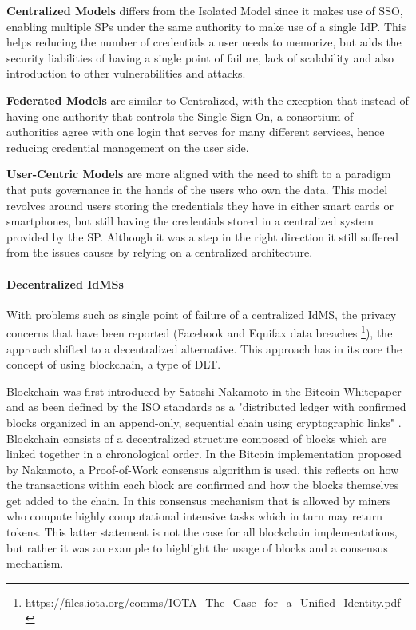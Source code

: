 \textbf{Centralized Models} differs from the Isolated Model since it makes use of \acrfull{SSO}, enabling multiple SPs under the same authority to make use of a single IdP. This helps reducing the number of credentials a user needs to memorize, but adds the security liabilities of having a single point of failure, lack of scalability and also introduction to other vulnerabilities and attacks.

\textbf{Federated Models} are similar to Centralized, with the exception that instead of having one authority that controls the Single Sign-On, a consortium of authorities agree with one login that serves for many different services, hence reducing credential management on the user side.

\textbf{User-Centric Models} are more aligned with the need to shift to a paradigm that puts governance in the hands of the users who own the data. This model revolves around users storing the credentials they have in either smart cards or smartphones, but still having the credentials stored in a centralized system provided by the SP. Although it was a step in the right direction it still suffered from the issues causes by relying on a centralized architecture.

\paragraph{Decentralized IdMSs}

With problems such as single point of failure of a centralized IdMS, the privacy concerns that have been reported (Facebook and Equifax data breaches \cite{zhu2018identity} \cite{van2019self} \footnote{\url{https://files.iota.org/comms/IOTA_The_Case_for_a_Unified_Identity.pdf}}), the approach shifted to a decentralized alternative. This approach has in its core the concept of using blockchain, a type of \acrfull{DLT}.

Blockchain was first introduced by Satoshi Nakamoto in the Bitcoin Whitepaper \cite{nakamoto2019bitcoin} and as been defined by the ISO standards as a "distributed ledger with confirmed blocks organized in an append-only, sequential chain using cryptographic links" \cite{ISO22739:2020(en)}. Blockchain consists of a decentralized structure composed of blocks which are linked together in a chronological order. In the Bitcoin implementation proposed by Nakamoto, a Proof-of-Work consensus algorithm is used, this reflects on how the transactions within each block are confirmed and how the blocks themselves get added to the chain. In this consensus mechanism that is allowed by miners who compute highly computational intensive tasks which in turn may return tokens. This latter statement is not the case for all blockchain implementations, but rather it was an example to highlight the usage of blocks and a consensus mechanism.

